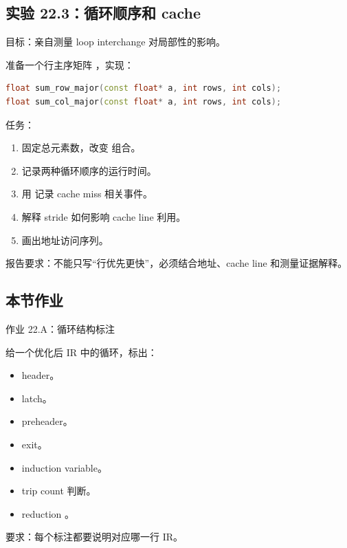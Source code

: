 \subsection{实验 22.3：循环顺序和 cache}

\begin{labbox}
目标：亲自测量 loop interchange 对局部性的影响。

准备一个行主序矩阵 ，实现：

\begin{lstlisting}[language=C++]
float sum_row_major(const float* a, int rows, int cols);
float sum_col_major(const float* a, int rows, int cols);
\end{lstlisting}

任务：

\begin{enumerate}
  \item 固定总元素数，改变  组合。
  \item 记录两种循环顺序的运行时间。
  \item 用  记录 cache miss 相关事件。
  \item 解释 stride 如何影响 cache line 利用。
  \item 画出地址访问序列。
\end{enumerate}

报告要求：不能只写“行优先更快”，必须结合地址、cache line 和测量证据解释。
\end{labbox}

\subsection{本节作业}

\begin{exercisebox}
作业 22.A：循环结构标注

给一个优化后 IR 中的循环，标出：

\begin{itemize}
  \item header。
  \item latch。
  \item preheader。
  \item exit。
  \item induction variable。
  \item trip count 判断。
  \item reduction 。
\end{itemize}

要求：每个标注都要说明对应哪一行 IR。
\end{exercisebox}

